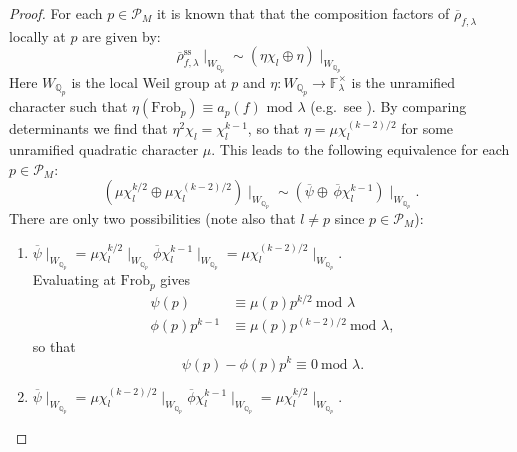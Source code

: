 \documentclass{amsart}
\theoremstyle{plain}
\theoremstyle{definition}
\begin{document}
\begin{proof}
For each $p\in \mathcal{P}_M$ it is known that that the composition factors of $\overline{\rho}_{f,\lambda}$ locally at $p$ are given by: 
\begin{equation*}
\overline{\rho}^{\text{ss}}_{f,\lambda}\mid_{W_{\mathbb{Q}_p}} \sim   \left(\eta\chi_l\oplus\eta\right)\mid_{W_{\mathbb{Q}_p}}
\end{equation*}
 Here $W_{\mathbb{Q}_p}$ is the local Weil group at $p$ and $\eta : W_{\mathbb{Q}_p}\rightarrow\mathbb{F}_\lambda^{\times}$ is the unramified character such that $\eta(\text{Frob}_p) \equiv a_p(f) \text{ mod } \lambda$ (e.g.\ see \cite[Theorem 4.2.7, (3)(b)]{hida}). By comparing determinants we find that $\eta^2\chi_l = \chi_l^{k-1}$, so that $\eta = \mu\chi_l^{(k-2)/2}$ for some unramified quadratic character $\mu$. This leads to the following equivalence for each $p\in \mathcal{P}_M$:
\begin{equation*}
   \left(\mu\chi_l^{k/2}\oplus\mu\chi_l^{(k-2)/2}\right)\mid_{W_{\mathbb{Q}_p}} \sim \left(\overline{\psi}\oplus \,\overline{\phi} \chi_l^{k-1}\right)\mid_{W_{\mathbb{Q}_p}}.
\end{equation*}
 There are only two possibilities (note also that $l\neq p$ since $p\in \mathcal{P}_M$):

\vspace{0.1in}
\begin{enumerate}
    \item[(A)] $\overline{\psi}\mid_{W_{\mathbb{Q}_p}} = \mu \chi_l^{k/2}\mid_{W_{\mathbb{Q}_p}}$\qquad{}\qquad  $\overline{\phi} \chi_l^{k-1}\mid_{W_{\mathbb{Q}_p}} = \mu  \chi_l^{(k-2)/2}\mid_{W_{\mathbb{Q}_p}}$.\\
    
    \noindent Evaluating at $\text{Frob}_p$ gives 
    \begin{align*}\psi(p) &\equiv \mu(p)p^{k/2} \ \text{mod } \lambda\\ \phi(p)p^{k-1} &\equiv \mu(p)p^{(k-2)/2} \ \text{mod } \lambda,\end{align*} so that 
    \begin{equation*}
        \psi(p) - \phi(p)p^k \equiv 0 \ \text{mod } \lambda.
    \end{equation*}
    \item[(B)] $\overline{\psi}\mid_{W_{\mathbb{Q}_p}} = \mu \chi_l^{(k-2)/2}\mid_{W_{\mathbb{Q}_p}}$\qquad{}\qquad $\overline{\phi} \chi_l^{k-1}\mid_{W_{\mathbb{Q}_p}} = \mu \chi_l^{k/2}\mid_{W_{\mathbb{Q}_p}}$. \\


\end{enumerate}
\end{proof}
\end{document}
